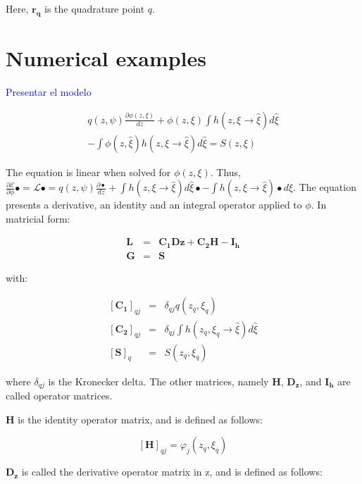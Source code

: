 \documentclass{CFD2011}
\begin{document}
Here, $\mathbf{r_q}$ is the quadrature point $q$.

\section{Numerical examples}
\textcolor{blue}{Presentar el modelo}

\begin{eqnarray}
q(z,\psi)\frac{\partial \phi(z,\xi)}{dz} +\phi(z,\xi)\int h(z,\xi\rightarrow\hat{\xi})d\hat{\xi} \nonumber \\
-\int \phi(z,\hat{\xi}) h(z,\xi\rightarrow\hat{\xi})d\hat{\xi} = S(z,\xi)
\end{eqnarray}

The equation is linear when solved for $\phi(z,\xi)$. Thus, $\frac{\partial \mathcal{E}}{\partial \phi}\bullet=\mathcal{L}\bullet=q(z,\psi)\frac{\partial \bullet}{dz} +\int h(z,\xi\rightarrow\hat{\xi})d\hat{\xi}\bullet -\int h(z,\xi\rightarrow\hat{\xi})\bullet d\hat{\xi}$. The equation presents a derivative, an identity and an integral operator applied to $\phi$. In matricial form:

\begin{eqnarray}
\mathbf{L}&=&\mathbf{C_1}\mathbf{Dz}+\mathbf{C_2}\mathbf{H}-\mathbf{I_h} \\
\mathbf{G}&=&\mathbf{S}
\end{eqnarray}

\noindent with:

\begin{eqnarray}
\left[\mathbf{C_1}\right]_{qj}&=& \delta_{qj}q(z_q,\xi_q) \nonumber \\
\left[\mathbf{C_2}\right]_{qj}&=& \delta_{qj}\int h(z_q,\xi_q\rightarrow\hat{\xi})d\hat{\xi} \nonumber \\
\left[\mathbf{S}\right]_{q}&=& S(z_q,\xi_q) \nonumber 
\end{eqnarray}

\noindent where $\delta_{qj}$ is the Kronecker delta. The other matrices, namely $\mathbf{H}$, $\mathbf{D_z}$, and $\mathbf{I_h}$ are called operator matrices.

$\mathbf{H}$ is the identity operator matrix, and is defined as follows:

\begin{equation}
\left[\mathbf{H}\right]_{qj}=\varphi_j(z_q,\xi_q)
\end{equation}

$\mathbf{D_z}$ is called the derivative operator matrix in z, and is defined as follows:
\end{document}
